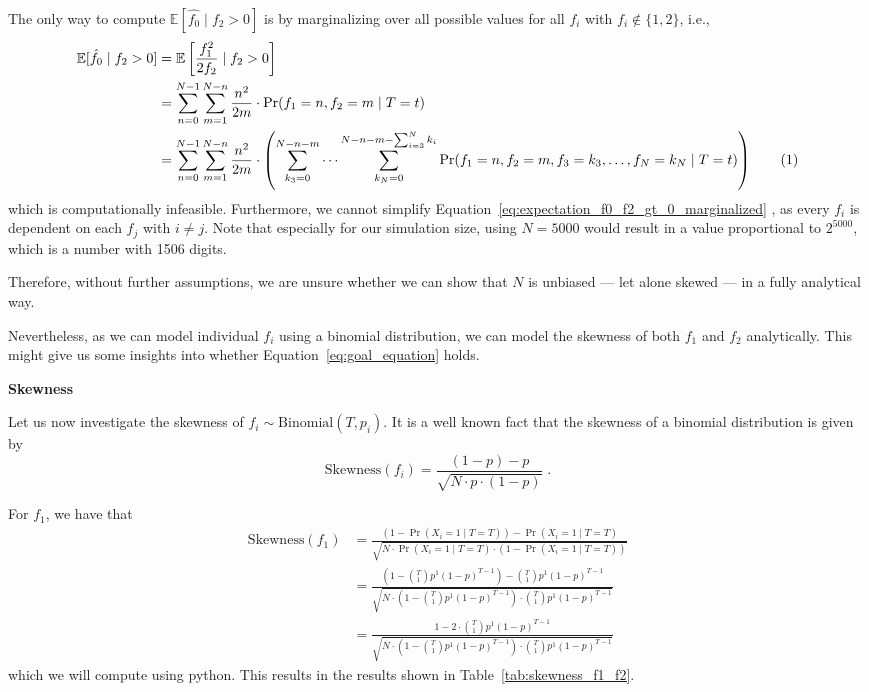 \documentclass{article}
\newcommand{\stepandtag}{%
  \refstepcounter{equation}%
  \tag{\theequation}%
}
\begin{document}
The only way to compute $\mathbb{E}[\hat{f_0}\mid f_2 > 0]$ is by marginalizing over all possible values for all $f_i$ with $f_i \notin \{1, 2\}$, i.e.,
\begin{align*}
    \mathbb{E}[\hat{f_0}\mid f_2 > 0] &= \mathbb{E}\left[ \frac{f_1^2}{2 f_2} \mid f_2 > 0 \right] \\
    &= \sum_{n=0}^{N-1} \sum_{m=1}^{N-n} \frac{n^2}{2 m} \cdot \Pr(f_1 = n, f_2 = m \mid T=t) \\
    &= \sum_{n=0}^{N-1} \sum_{m=1}^{N-n} \frac{n^2}{2 m} \cdot \left( \sum_{k_3 = 0}^{N-n-m} \cdots \sum_{k_N = 0}^{N-n-m-\sum_{i=3}^{N}k_i} \Pr(f_1 = n, f_2 = m, f_3 = k_3, \dots, f_N=k_N \mid T=t) \right) \stepandtag \label{eq:expectation_f0_f2_gt_0_marginalized}
\end{align*}
which is computationally infeasible. Furthermore, we cannot simplify Equation~\ref{eq:expectation_f0_f2_gt_0_marginalized} , as every $f_i$ is dependent on each $f_j$ with $i\neq j$. Note that especially for our simulation size, using $N=5000$ would result in a value proportional to $2^{5000}$, which is a number with 1506 digits.

Therefore, without further assumptions, we are unsure whether we can show that $N$ is unbiased --- let alone skewed --- in a fully analytical way.

Nevertheless, as we can model individual $f_i$ using a binomial distribution, we can model the skewness of both $f_1$ and $f_2$ analytically. This might give us some insights into whether Equation~\ref{eq:goal_equation} holds.


\textbf{Skewness}

Let us now investigate the skewness of $f_i \sim \mathrm{Binomial}(T, p_i)$. 
It is a well known fact that the skewness of a binomial distribution is given by 
\begin{equation*}
    \mathrm{Skewness}(f_i) = \frac{(1-p) - p}{\sqrt{N \cdot p \cdot (1-p)}}\;.
\end{equation*}

For $f_1$, we have that 
\begin{align*}
    \mathrm{Skewness}(f_1) &= \frac{(1 - \Pr(X_i = 1 \mid T=T)) - \Pr(X_i = 1 \mid T=T)}{\sqrt{N \cdot \Pr(X_i = 1 \mid T=T) \cdot (1 - \Pr(X_i = 1 \mid T=T))}} \\
    &= \frac{\left( 1 - \binom{T}{1} p^1 {(1-p)}^{T-1} \right) - \binom{T}{1} p^1 {(1-p)}^{T-1}}{\sqrt{
        N \cdot \left( 1 - \binom{T}{1} p^1 {(1-p)}^{T-1} \right) \cdot \binom{T}{1} p^1 {(1-p)}^{T-1}
    }} \\
    &= \frac{ 1 - 2 \cdot \binom{T}{1} p^1 {(1-p)}^{T-1}}{\sqrt{
        N \cdot \left( 1 - \binom{T}{1} p^1 {(1-p)}^{T-1} \right) \cdot \binom{T}{1} p^1 {(1-p)}^{T-1}
    }} 
\end{align*}
which we will compute using python. This results in the results shown in Table~\ref{tab:skewness_f1_f2}.
\end{document}
